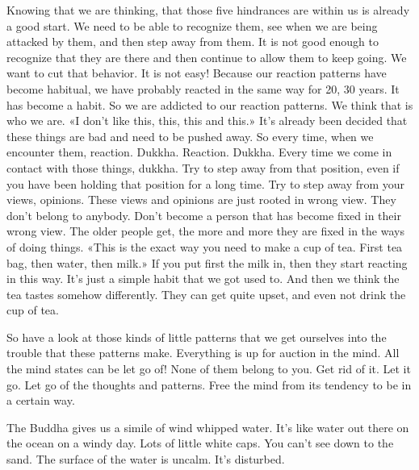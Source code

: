 \documentclass[letterpaper,10pt,english]{sphinxmanual}
\begin{document}
\sphinxAtStartPar
Knowing that we are thinking, that those five hindrances are within us
is already a good start. We need to be able to recognize them, see when we
are being attacked by them, and then step away from them. It is not good
enough to recognize that they are there and then continue to allow them to
keep going. We want to cut that behavior. It is not easy! Because our reaction
patterns have become habitual, we have probably reacted in the same way
for 20, 30 years. It has become a habit. So we are addicted to our reaction
patterns. We think that is who we are. «I don’t like this, this, this and this.»
It’s  already  been  decided  that  these  things  are  bad  and  need  to  be  pushed
away. So every time, when we encounter them, reaction. Dukkha. Reaction.
Dukkha. Every time we come in contact with those things, dukkha. Try to
step  away  from  that  position,  even  if  you  have  been  holding  that  position
for a long time. Try to step away from your views, opinions. These views
and opinions are just rooted in wrong view. They don’t belong to anybody.
Don’t become a person that has become fixed in their wrong view. The older
people get, the more and more they are fixed in the ways of doing things.
«This  is  the  exact  way  you  need  to  make  a  cup  of  tea.  First  tea  bag,  then
water, then milk.» If you put first the milk in, then they start reacting in this
way. It’s just a simple habit that we got used to. And then we think the tea
tastes somehow differently. They can get quite upset, and even not drink the
cup of tea.

\sphinxAtStartPar
So have a look at those kinds of little patterns that we get ourselves
into the trouble that these patterns make. Everything is up for auction in the
  mind. All the mind states can be let go of! None of them belong to you. Get
rid of it. Let it go. Let go of the thoughts and patterns. Free the mind from its
tendency to be in a certain way.

\sphinxAtStartPar
The Buddha gives us a simile of wind whipped water. It’s like water out
there on the ocean on a windy day. Lots of little white caps. You can’t see
down to the sand. The surface of the water is uncalm. It’s disturbed.
\end{document}
